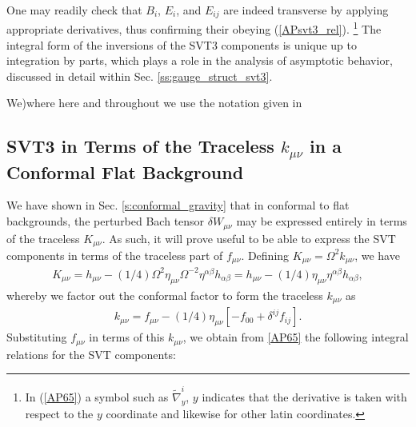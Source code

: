 %
One may readily check that $B_i$, $E_i$, and $E_{ij}$ are indeed transverse by applying appropriate derivatives, thus confirming their obeying (\ref{APsvt3_rel}).
 \footnote{In (\ref{AP65}) a symbol such as $\tilde{\nabla}_y^i$, $y$ indicates that the derivative is taken with respect to the $y$ coordinate and likewise for other latin coordinates.}
The integral form of the inversions of the SVT3 components is unique up to integration by parts, which plays a role in the analysis of asymptotic behavior, discussed in detail within Sec. \ref{ss:gauge_struct_svt3}.

We)where here and throughout we use the notation given in \cite{weinberg_1972}

\subsection{SVT3 in Terms of the Traceless $k_{\mu\nu}$ in a Conformal Flat Background}
\label{ss:svt3_in_terms_of_k_mu_nu}
We have shown in Sec. \ref{s:conformal_gravity} that in conformal to flat backgrounds, the perturbed Bach tensor $\delta W_{\mu\nu}$ may be expressed entirely in terms of the traceless $K_{\mu\nu}$. As such, it will prove useful to be able to express the SVT components in terms of the traceless part of $f_{\mu\nu}$. Defining $K_{\mu\nu}=\Omega^2k_{\mu\nu}$, we have
\begin{eqnarray}
K_{\mu\nu}=h_{\mu\nu}-(1/4)\Omega^2\eta_{\mu\nu}\Omega^{-2}\eta^{\alpha\beta}h_{\alpha\beta}=h_{\mu\nu}-(1/4)\eta_{\mu\nu}\eta^{\alpha\beta}h_{\alpha\beta},
\end{eqnarray}
whereby we factor out the conformal factor to form the traceless $k_{\mu\nu}$ as
\begin{eqnarray}
k_{\mu\nu}=f_{\mu\nu}-(1/4)\eta_{\mu\nu}[-f_{00}+\delta^{ij}f_{ij}].
\end{eqnarray}
%
Substituting $f_{\mu\nu}$ in terms of this $k_{\mu\nu}$, we obtain from \eqref{AP65} the following integral relations for the SVT components:

